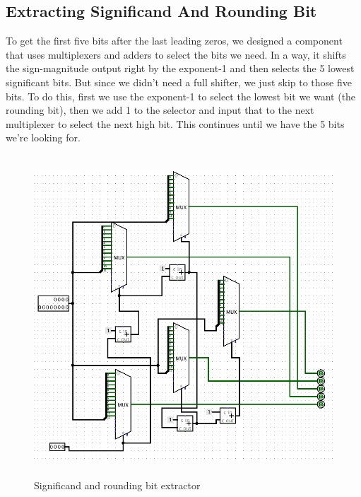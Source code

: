 \documentclass[paper=letter, fontsize=11pt]{scrartcl}
\begin{document}
\subsection{Extracting Significand And Rounding Bit}
To get the first five bits after the last leading zeros, we designed a component that uses multiplexers and adders to select the bits we need. In a way, it shifts the sign-magnitude output right by the exponent-1 and then selects the 5 lowest significant bits. But since we didn't need a full shifter, we just skip to those five bits. To do this, first we use the exponent-1 to select the lowest bit we want (the rounding bit), then we add 1 to the selector and input that to the next multiplexer to select the next high bit. This continues until we have the 5 bits we're looking for.
\begin{figure}[H]
\includegraphics[height=120mm]{shifter.png}
\centering
\caption{Significand and rounding bit extractor}
\label{overflow}
\end{figure}

\pagebreak
\end{document}
